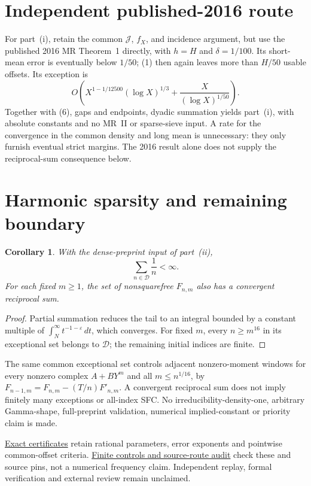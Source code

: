 \documentclass[11pt]{article}
\newtheorem{corollary}[theorem]{Corollary}
\begin{document}
\section{Independent published-2016 route}
For part~(i), retain the common $\mathcal J$, $f_X$, and incidence argument,
but use the published 2016 MR Theorem~1 directly, with $h=H$ and $\delta=1/100$.
Its short-mean error is eventually below $1/50$; (1) then again leaves
more than $H/50$ usable offsets.
Its exception is
\[
 O\left(X^{1-1/12500}(\log X)^{1/3}
                  +\frac{X}{(\log X)^{1/50}}\right).
\]
Together with (6), gaps and endpoints, dyadic summation yields part~(i),
with absolute constants and no MR~II or sparse-sieve input.
A rate for the convergence in the common density and long mean is
unnecessary: they only furnish eventual strict margins.
The 2016 result alone does not supply the reciprocal-sum consequence below.

\section{Harmonic sparsity and remaining boundary}
\begin{corollary}\label{cor:harmonic}
With the dense-preprint input of part~(ii),
\[
 \sum_{n\in\mathcal D}\frac1n<\infty.
\]
For each fixed $m\ge1$, the set of nonsquarefree $F_{n,m}$ also has a
convergent reciprocal sum.
\end{corollary}
\begin{proof}
Partial summation reduces the tail to an integral bounded by a constant
multiple of $\int_N^\infty t^{-1-\varepsilon}\,dt$, which converges.
For fixed $m$, every $n\ge m^{16}$ in its exceptional set belongs to
$\mathcal D$; the remaining initial indices are finite.
\end{proof}
The same common exceptional set controls adjacent nonzero-moment windows
for every nonzero complex $A+BY^m$ and all $m\le n^{1/16}$, by
$F_{n-1,m}=F_{n,m}-(T/n)F'_{n,m}$.
A convergent reciprocal sum does not imply finitely many exceptions or
all-index SFC. No irreducibility-density-one, arbitrary Gamma-shape,
full-preprint validation, numerical implied-constant or priority claim is made.

\href{simultaneous_squarefree.py}{Exact certificates} retain rational
parameters, error exponents and pointwise common-offset criteria.
\href{verify_simultaneous_squarefree.py}{Finite controls and source-route audit}
check these and source pins, not a numerical frequency claim.
Independent replay, formal verification and external review remain unclaimed.
\end{document}
